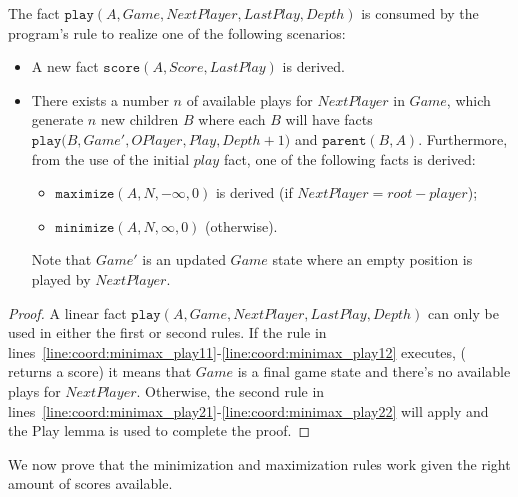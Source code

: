 \begin{lemma}

The fact $\mathtt{play}(A, Game, NextPlayer, LastPlay, Depth)$ is consumed by
the program's rule to realize one of the following scenarios:

\begin{itemize}
   \item A new fact $\mathtt{score}(A, Score, LastPlay)$ is derived.

   \item There exists a number $n$ of available plays for $NextPlayer$ in
      $Game$, which generate $n$ new children $B$ where each $B$ will have facts
      $\mathtt{play}(B, Game', OPlayer, Play,$$ Depth + 1)$ and
      $\mathtt{parent}(B, A)$. Furthermore, from the use of the initial
      $play$ fact, one of the following facts is derived:

\begin{itemize}
   \item $\mathtt{maximize}(A, N, -\infty, 0)$ is derived (if $NextPlayer =
      root-player$);
   \item $\mathtt{minimize}(A, N, \infty, 0)$ (otherwise).
\end{itemize}

Note that $Game'$ is an updated $Game$ state where an empty position is played
by $NextPlayer$.

\end{itemize}

\end{lemma}
\begin{proof}

A linear fact $\mathtt{play}(A, Game, NextPlayer, LastPlay, Depth)$ can only be
used in either the first or second rules.  If the rule in
lines~\ref{line:coord:minimax_play11}-\ref{line:coord:minimax_play12} executes,
( returns a score) it means that $Game$ is a final game
state and there's no available plays for $NextPlayer$.  Otherwise, the second
rule in lines~\ref{line:coord:minimax_play21}-\ref{line:coord:minimax_play22}
will apply and the Play lemma is used to complete the proof.

\end{proof}

We now prove that the minimization and maximization rules work given the right
amount of scores available.


